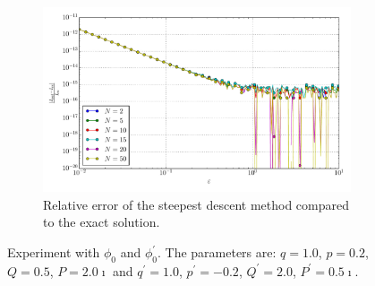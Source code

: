 \documentclass[a4paper,10pt]{article}
\begin{document}
\begin{figure}[ht!]
\begin{subfigure}[t]{0.5\linewidth}
    \includegraphics[width=\linewidth]{./plots/tp_1d_conv_eps_0_0_err_rel_nsd.pdf}
    \caption{Relative error of the steepest descent method compared to the exact solution.}
    \label{fig:tp_1d_conv_eps_0_0_err_rel_nsd}
  \end{subfigure}
  \label{fig:tp_1d_conv_eps_0_0}
  \caption{Experiment with $\phi_{0}$ and $\phi_{0}^{\prime}$.
  The parameters are:
  $q=1.0$, $p=0.2$, $Q=0.5$, $P=2.0\imath$ and
  $q^\prime=1.0$, $p^\prime=-0.2$, $Q^\prime=2.0$, $P^\prime=0.5\imath$.}
\end{figure}
\end{document}

